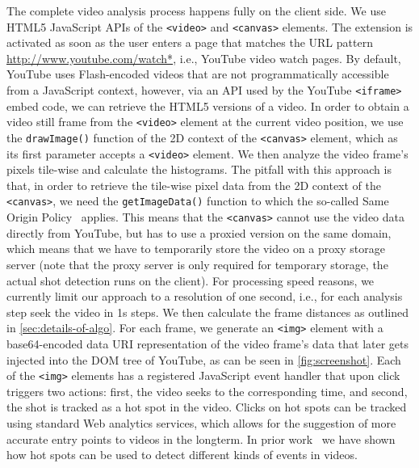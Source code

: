 \documentclass{acm_proc_article-sp}
\newcommand{\inlinelistingsize}{\fontsize{8pt}{11pt}}
\let\oldurl\url
\renewcommand{\url}[1]{\inlinelistingsize\oldurl{#1}}
\begin{document}
The complete video analysis process happens fully on the client side. We use HTML5 JavaScript APIs of the \texttt{<video>} and \texttt{<canvas>} elements. The extension is activated as soon as the user enters a page that matches the URL pattern \url{http://www.youtube.com/watch*}, i.e., YouTube video watch pages. By default, YouTube uses Flash-encoded videos that are not programmatically accessible from a JavaScript context, however, via an API used by the YouTube \texttt{<iframe>} embed code, we can retrieve the HTML5 versions of a video. In order to obtain a video still frame from the \texttt{<video>} element at the current video position, we use the \texttt{drawImage()} function of the 2D context of the \texttt{<canvas>} element, which as its first parameter accepts a \texttt{<video>} element. We then analyze the video frame's pixels tile-wise and calculate the histograms. The pitfall with this approach is that, in order to retrieve the tile-wise pixel data from the 2D context of the \texttt{<canvas>}, we need the \texttt{getImageData()} function to which the so-called Same Origin Policy~\cite{sameoriginpolicy} applies. This means that the \texttt{<canvas>} cannot use the video data directly  from YouTube, but has to use a proxied version on the same domain, which means that we have to temporarily store the video on a proxy storage server (note that the proxy server is only required for temporary storage, the actual shot detection runs on the client). For processing speed reasons, we currently limit our approach to a resolution of one second, i.e., for each analysis step seek the video in 1s steps. We then calculate the frame distances as outlined in \autoref{sec:details-of-algo}. For each frame, we generate an \texttt{<img>} element with a base64-encoded data URI representation of the video frame's data that later gets injected into the DOM tree of YouTube, as can be seen in \autoref{fig:screenshot}. Each of the \texttt{<img>} elements has a registered JavaScript event handler that upon click triggers two actions: first, the video seeks to the corresponding time, and second, the shot is tracked as a hot spot in the video. Clicks on hot spots can be tracked using standard Web analytics services, which allows for the suggestion of more accurate entry points to videos in the longterm. 
In prior work~\cite{derive2011} we have shown how hot spots can be used to detect different kinds of events in videos.
\end{document}
